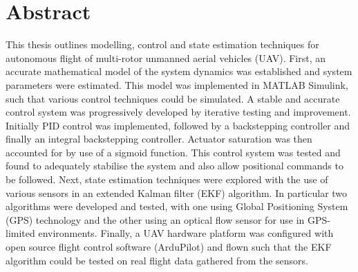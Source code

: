 
\chapter*{Abstract}\label{Abstract}
This thesis outlines modelling, control and state estimation techniques for autonomous flight of multi-rotor unmanned aerial vehicles (UAV). First, an accurate mathematical model of the system dynamics was established and system parameters were estimated. This model was implemented in MATLAB Simulink, such that various control techniques could be simulated. A stable and accurate control system was progressively developed by iterative testing and improvement. Initially PID control was implemented, followed by a backstepping controller and finally an integral backstepping controller. Actuator saturation was then accounted for by use of a sigmoid function. This control system was tested and found to adequately stabilise the system and also allow positional commands to be followed. Next, state estimation techniques were explored with the use of various sensors in an extended Kalman filter (EKF) algorithm. In particular two algorithms were developed and tested, with one using Global Positioning System (GPS) technology and the other using an optical flow sensor for use in GPS-limited environments. Finally, a UAV hardware platform was configured with open source flight control software (ArduPilot) and flown such that the EKF algorithm could be tested on real flight data gathered from the sensors.
\clearpage


